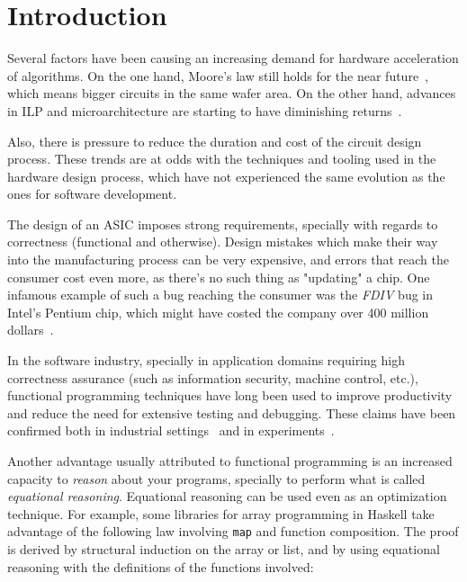 \chapter{Introduction}
\label{chap:intro}
    Several factors have been causing an increasing demand for hardware acceleration of algorithms.
    On the one hand, Moore's law still holds for the near future~\cite{itrs},
    which means bigger circuits in the same wafer area.
    On the other hand, advances in \ac{ILP} and microarchitecture are starting to have diminishing
    returns~\cite{dark-silicon}.

    Also, there is pressure to reduce the duration and cost of the circuit design process.
    These trends are at odds with the techniques and tooling used in the hardware design process,
    which have not experienced the same evolution as the ones for software development.

    The design of an \ac{ASIC} imposes strong requirements,
    specially with regards to correctness (functional and otherwise).
    Design mistakes which make their way into the manufacturing process can be very expensive,
    and errors that reach the consumer cost even more, as there's no such thing as "updating" a chip.
    One infamous example of such a bug reaching the consumer was the \emph{FDIV} bug in Intel's Pentium chip,
    which might have costed the company over 400 million dollars~\cite{intel-fdiv}.

    In the software industry, specially in application domains requiring high correctness assurance
    (such as information security, machine control, etc.),
    functional programming techniques have long been used to improve productivity
    and reduce the need for extensive testing and debugging.
    These claims have been confirmed both in industrial settings~\cite{haskell-productivity-wiger}
    and in experiments~\cite{haskell-productivity-hudak}.

    Another advantage usually attributed to functional programming is an increased capacity to
    \emph{reason} about your programs, specially to perform what is called \emph{equational reasoning}.
    Equational reasoning can be used even as an optimization technique.
    For example, some libraries for array programming in Haskell take advantage of the following
    law involving \texttt{map} and function composition.
    The proof is derived by structural induction on the array or list,
    and by using equational reasoning with the definitions of the functions involved:

